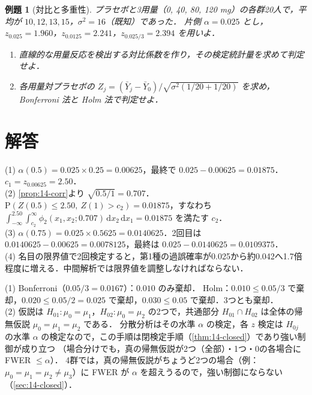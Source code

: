 \documentclass[a4paper,11pt,openany]{ltjsbook}
\newtheorem{reidai}{例題}[chapter]
\newenvironment{kaitou}[1]{%
  \par\medskip\noindent
  \begin{tcolorbox}[enhanced,breakable,colback=bkgray!3,colframe=bkgray!60,boxrule=0.4pt,
    left=4pt,right=4pt,top=2pt,bottom=2pt,arc=1pt,
    title={\cref{#1}の解答},fonttitle=\bfseries\small,coltitle=white,colbacktitle=bkgray!80]}%
  {\end{tcolorbox}\par}
\newcommand{\Prob}{\mathrm{P}}
\newcommand{\dd}{\mathrm{d}}
\begin{document}
\begin{reidai}[対比と多重性]\label{reidai:14-3}
プラセボと3用量（0, 40, 80, 120 mg）の各群20人で，平均が $10,12,13,15$，$\sigma^2=16$（既知）であった．
片側 $\alpha=0.025$ とし，$z_{0.025}=1.960$，$z_{0.0125}=2.241$，$z_{0.025/3}=2.394$ を用いよ．
\begin{enumerate}[label=(\arabic*)]
\item 直線的な用量反応を検出する対比係数を作り，その検定統計量を求めて判定せよ．
\item 各用量対プラセボの $Z_j=(\bar Y_j-\bar Y_0)/\sqrt{\sigma^2(1/20+1/20)}$ を求め，Bonferroni 法と Holm 法で判定せよ．
\end{enumerate}
\end{reidai}

\section{解答}\label{sec:14-sol}
\begin{kaitou}{reidai:14-1}
(1) $\alpha(0.5)=0.025\times0.25=0.00625$，最終で $0.025-0.00625=0.01875$．$c_1=z_{0.00625}=2.50$．\\
(2) \cref{prop:14-corr}より $\sqrt{0.5/1}=0.707$．$\Prob(Z(0.5)\le2.50,\ Z(1)>c_2)=0.01875$，すなわち
$\int_{-\infty}^{2.50}\int_{c_2}^{\infty}\phi_2(x_1,x_2;0.707)\,\dd x_2\,\dd x_1=0.01875$ を満たす $c_2$．\\
(3) $\alpha(0.75)=0.025\times0.5625=0.0140625$．2回目は $0.0140625-0.00625=0.0078125$，最終は $0.025-0.0140625=0.0109375$．\\
(4) 名目の限界値で2回検定すると，第1種の過誤確率が0.025から約0.042へ1.7倍程度に増える．中間解析では限界値を調整しなければならない．
\end{kaitou}

\begin{kaitou}{reidai:14-2}
(1) Bonferroni（$0.05/3=0.0167$）：$0.010$ のみ棄却．
Holm：$0.010\le0.05/3$ で棄却，$0.020\le0.05/2=0.025$ で棄却，$0.030\le0.05$ で棄却．3つとも棄却．\\
(2) 仮説は $H_{01}:\mu_0=\mu_1$，$H_{02}:\mu_0=\mu_2$ の2つで，共通部分 $H_{01}\cap H_{02}$ は全体の帰無仮説 $\mu_0=\mu_1=\mu_2$ である．
分散分析はその水準 $\alpha$ の検定，各 $z$ 検定は $H_{0j}$ の水準 $\alpha$ の検定なので，この手順は閉検定手順（\cref{thm:14-closed}）であり強い制御が成り立つ
（場合分けでも，真の帰無仮説が2つ（全部）・1つ・0の各場合に FWER $\le\alpha$）．
4群では，真の帰無仮説がちょうど2つの場合（例：$\mu_0=\mu_1=\mu_2\ne\mu_3$）に FWER が $\alpha$ を超えうるので，強い制御にならない（\cref{sec:14-closed}）．
\end{kaitou}
\end{document}
